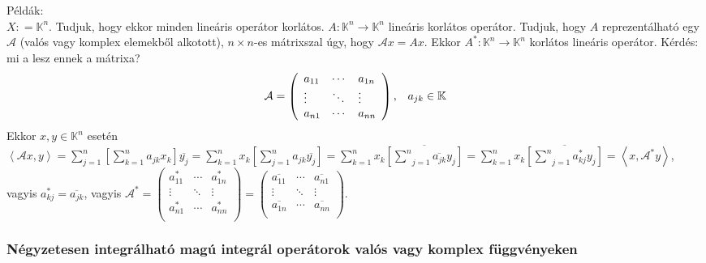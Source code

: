 \documentclass[12pt,a4paper]{scrartcl}
\newenvironment{pelda}{}{}
\begin{document}
\begin{pelda}

Példák:\\
\(X: = {\mathbb{K}}^{n}\). Tudjuk, hogy ekkor minden lineáris operátor
korlátos.
\(\left. A:{\mathbb{K}}^{n}\rightarrow{\mathbb{K}}^{n} \right.\)
lineáris korlátos operátor. Tudjuk, hogy \(A\) reprezentálható egy
\(\mathcal{A}\) (valós vagy komplex elemekből alkotott),
\(n \times n\)-es mátrixszal úgy, hogy \(\mathcal{A}x = Ax\). Ekkor
\(\left. A^{*}:{\mathbb{K}}^{n}\rightarrow{\mathbb{K}}^{n} \right.\)
korlátos lineáris operátor. Kérdés: mi a lesz ennek a mátrixa?
\[\mathcal{A} = \left( \begin{array}{lll}
a_{11} & \cdots & a_{1n} \\
 \vdots & \ddots & \vdots \\
a_{n1} & \cdots & a_{nn} \\
\end{array} \right)\text{,\quad}a_{jk} \in {\mathbb{K}}\] Ekkor
\(x,y \in {\mathbb{K}}^{n}\) esetén
\(\left\langle {\mathcal{A}x,y} \right\rangle = {\sum\limits_{j = 1}^{n}{\left\lbrack {\sum\limits_{k = 1}^{n}{a_{jk}x_{k}}} \right\rbrack\overline{y_{j}}}} = {\sum\limits_{k = 1}^{n}x_{k}}\left\lbrack {\sum\limits_{j = 1}^{n}{a_{jk}\overline{y_{j}}}} \right\rbrack = {\sum\limits_{k = 1}^{n}{x_{k}\overline{\left\lbrack {\underset{j=1}{\overset{n}{\sum}}{\overline{a_{jk}}y_{j}}} \right\rbrack}}} = {\sum\limits_{k = 1}^{n}{x_{k}\overline{\left\lbrack {\underset{j=1}{\overset{n}{\sum}}{a_{kj}^{*}y_{j}}} \right\rbrack} = \left\langle {x,\mathcal{A}^{*}y} \right\rangle}}\),
vagyis \(a_{kj}^{*} = \overline{a_{jk}}\), vagyis
\(\mathcal{A}^{*} = \left( \begin{array}{lll} a_{11}^{*} & \cdots & a_{1n}^{*} \\  \vdots & \ddots & \vdots \\ a_{n1}^{*} & \cdots & a_{nn}^{*} \\ \end{array} \right) = \left( \begin{array}{lll} \overline{a_{11}} & \cdots & \overline{a_{n1}} \\  \vdots & \ddots & \vdots \\ \overline{a_{1n}} & \cdots & \overline{a_{nn}} \\ \end{array} \right)\).

\end{pelda}

\hypertarget{negyzetesen-integralhato-magu-integral-operatorok-valos-vagy-komplex-fuggvenyeken}{%
\subsubsection{\texorpdfstring{\textbf{Négyzetesen integrálható magú
integrál operátorok valós vagy komplex
függvényeken}}{Négyzetesen integrálható magú integrál operátorok valós vagy komplex függvényeken}}\label{negyzetesen-integralhato-magu-integral-operatorok-valos-vagy-komplex-fuggvenyeken}}
\end{document}
